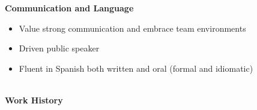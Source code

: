 \documentclass[letterpaper,11pt]{article}
\begin{document}
\noindent\textbf{Communication and Language}
\begin{itemize}[noitemsep,topsep=0pt]
	\item Value strong communication and embrace team environments
	\item Driven public speaker
	\item Fluent in Spanish both written and oral (formal and idiomatic)
\end{itemize}


\begin{Large}\textbf{\\Work History}\end{Large}
\end{document}

